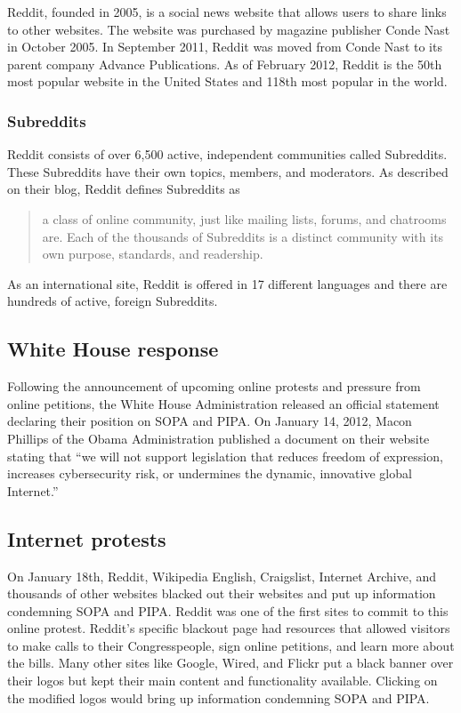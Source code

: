 \documentclass[11pt]{article}
\begin{document}
\begin{multicols}{2}
Reddit, founded in 2005, is a social news website that allows users to share links to other websites.\cite{reddit-history} The website was purchased by magazine publisher Conde Nast in October 2005. In September 2011, Reddit was moved from Conde Nast to its parent company Advance Publications. As of February 2012, Reddit is the 50th most popular website in the United States and 118th most popular in the world.\cite{alexa-reddit}

   \subsubsection{Subreddits}

Reddit consists of over 6,500 active, independent communities called Subreddits.\cite{metareddit} These Subreddits have their own topics, members, and moderators. As described on their blog, Reddit defines Subreddits as

\begin{quote}a class of online community, just like mailing lists, forums, and chatrooms are. Each of the thousands of Subreddits is a distinct community with its own purpose, standards, and readership.\cite{how-reddit-works}\end{quote}

As an international site, Reddit is offered in 17 different languages and there are hundreds of active, foreign Subreddits.\cite{reddit-faqs-languages}\cite{reddit-directory-cities}

   \subsection{White House response}

Following the announcement of upcoming online protests and pressure from online petitions, the White House Administration released an official statement declaring their position on SOPA and PIPA. On January 14, 2012, Macon Phillips of the Obama Administration published a document on their website stating that ``we will not support legislation that reduces freedom of expression, increases cybersecurity risk, or undermines the dynamic, innovative global Internet.''\cite{white-house-sopa-pipa}

   \subsection{Internet protests}

On January 18th, Reddit, Wikipedia English, Craigslist, Internet Archive, and thousands of other websites blacked out their websites and put up information condemning SOPA and PIPA.\cite{sopa-strike-participants} Reddit was one of the first sites to commit to this online protest.\cite{nytimes-public-outcry} Reddit's specific blackout page had resources that allowed visitors to make calls to their Congresspeople, sign online petitions, and learn more about the bills.\cite{reddit-blackout-site} Many other sites like Google, Wired, and Flickr put a black banner over their logos but kept their main content and functionality available. Clicking on the modified logos would bring up information condemning SOPA and PIPA.\cite{blackout-logos}


\end{multicols}
\end{document}
